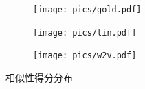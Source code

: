 \documentclass{article}
\begin{document}
\begin{figure}[h]
  \begin{subfigure}{.42\textwidth}
    \texttt{[image: pics/gold.pdf]}
    \caption{}
    \label{fig:gold}
  \end{subfigure}
  \hfill
  \begin{subfigure}{.42\textwidth}
    \texttt{[image: pics/lin.pdf]}
    \caption{}
    \label{fig:lin}
  \end{subfigure}
  \begin{subfigure}{.42\textwidth}
    \centering
    \texttt{[image: pics/w2v.pdf]}
    \caption{}
    \label{fig:w2v}
  \end{subfigure}%
  \caption{相似性得分分布}
  \label{fig:distrib}
  \end{figure}


\end{document}
